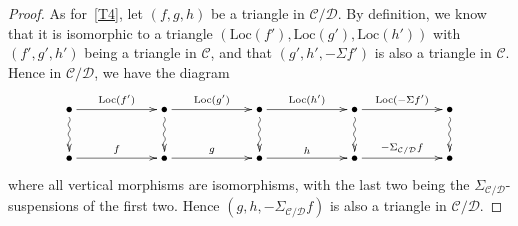 \documentclass{amsproc}
\theoremstyle{definition}
\begin{document}
\begin{proof}
As for~\ref{T4}, let $(f,g,h)$ be a triangle in ${\mathcal{C}}/{\mathcal{D}}$. By definition, we know that it is isomorphic to a triangle $({\mathrm{Loc}}(f'),{\mathrm{Loc}}(g'),{\mathrm{Loc}}(h'))$ with $(f',g',h')$ being a triangle in ${\mathcal{C}}$, and that $(g',h',-\Sigma f')$ is also a triangle in ${\mathcal{C}}$. Hence in ${\mathcal{C}}/{\mathcal{D}}$, we have the diagram
\begin{displaymath}
\xymatrix@!C@C+33pt{ \bullet \ar[r]^{{\mathrm{Loc}}(f')} \ar@{~>}[d] & \bullet \ar[r]^{{\mathrm{Loc}}(g')} \ar@{~>}[d] & \bullet \ar[r]^{{\mathrm{Loc}}(h')} \ar@{~>}[d] & \bullet \ar[r]^{{\mathrm{Loc}}(-\Sigma f')} \ar@{~>}[d] & \bullet \ar@{~>}[d] \\
 \bullet \ar[r]^f & \bullet \ar[r]^g & \bullet \ar[r]^h & \bullet \ar[r]^{-\Sigma_{{\mathcal{C}}/{\mathcal{D}}} f} & \bullet }
\end{displaymath}
where all vertical morphisms are isomorphisms, with the last two being the $\Sigma_{{\mathcal{C}}/{\mathcal{D}}}$-suspensions of the first two. Hence $(g,h,-\Sigma_{{\mathcal{C}}/{\mathcal{D}}} f)$ is also a triangle in ${\mathcal{C}}/{\mathcal{D}}$.


\end{proof}
\end{document}
